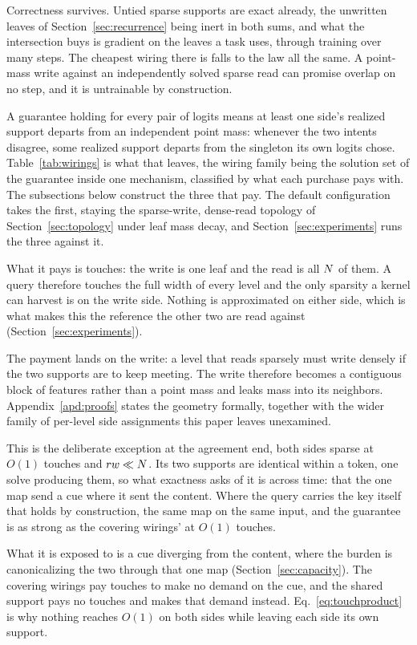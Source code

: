 Correctness survives. Untied sparse supports are exact already, the unwritten leaves of Section~\ref{sec:recurrence} being inert in both sums, and what the intersection buys is gradient on the leaves a task uses, through training over many steps. The cheapest wiring there is falls to the law all the same. A point-mass write against an independently solved sparse read can promise overlap on no step, and it is untrainable by construction.

A guarantee holding for every pair of logits means at least one side's realized support departs from an independent point mass: whenever the two intents disagree, some realized support departs from the singleton its own logits chose. Table~\ref{tab:wirings} is what that leaves, the wiring family being the solution set of the guarantee inside one mechanism, classified by what each purchase pays with. The subsections below construct the three that pay. The default configuration takes the first, staying the sparse-write, dense-read topology of Section~\ref{sec:topology} under leaf mass decay, and Section~\ref{sec:experiments} runs the three against it.

What it pays is touches: the write is one leaf and the read is all $N$ of them. A query therefore touches the full width of every level and the only sparsity a kernel can harvest is on the write side. Nothing is approximated on either side, which is what makes this the reference the other two are read against (Section~\ref{sec:experiments}).

The payment lands on the write: a level that reads sparsely must write densely if the two supports are to keep meeting. The write therefore becomes a contiguous block of features rather than a point mass and leaks mass into its neighbors. Appendix~\ref{apd:proofs} states the geometry formally, together with the wider family of per-level side assignments this paper leaves unexamined.

This is the deliberate exception at the agreement end, both sides sparse at $O(1)$ touches and $r w \ll N$. Its two supports are identical within a token, one solve producing them, so what exactness asks of it is across time: that the one map send a cue where it sent the content. Where the query carries the key itself that holds by construction, the same map on the same input, and the guarantee is as strong as the covering wirings' at $O(1)$ touches.

What it is exposed to is a cue diverging from the content, where the burden is canonicalizing the two through that one map (Section~\ref{sec:capacity}). The covering wirings pay touches to make no demand on the cue, and the shared support pays no touches and makes that demand instead. Eq.~\eqref{eq:touchproduct} is why nothing reaches $O(1)$ on both sides while leaving each side its own support.

